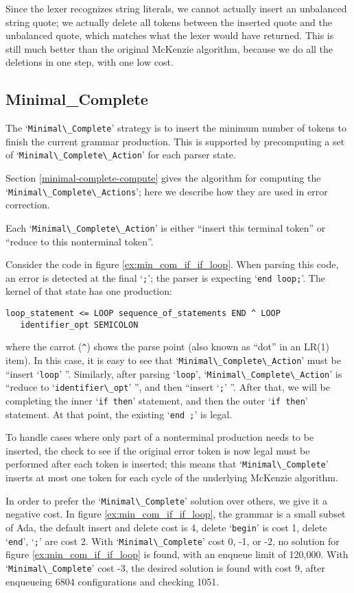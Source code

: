 \documentclass[authordraft]{acmart}
\newcommand{\code}[1]{`\lstinline|#1|'}
\begin{document}
Since the lexer recognizes string literals, we cannot actually insert
an unbalanced string quote; we actually delete all tokens between the
inserted quote and the unbalanced quote, which matches what the lexer
would have returned. This is still much better than the original
McKenzie algorithm, because we do all the deletions in one step, with
one low cost.

\subsection{Minimal\_Complete}
The \code{Minimal\_Complete} strategy is to insert the minimum number
of tokens to finish the current grammar production. This is supported
by precomputing a set of \code{Minimal\_Complete\_Action} for each
parser state.

Section \ref{minimal-complete-compute} gives the algorithm for
computing the \code{Minimal\_Complete\_Actions}; here we describe how
they are used in error correction.

Each \code{Minimal\_Complete\_Action} is either ``insert this terminal
token'' or ``reduce to this nonterminal token''.

Consider the code in figure \ref{ex:min_com_if_if_loop}. When
parsing this code, an error is detected at the final \code{;}; the
parser is expecting \code{end loop;}. The kernel of that state has one
production:
\begin{verbatim}
loop_statement <= LOOP sequence_of_statements END ^ LOOP
   identifier_opt SEMICOLON
\end{verbatim}
where the carrot (\verb|^|) shows the parse point (also known as
``dot'' in an LR(1) item). In this case, it is easy to see that
\code{Minimal\_Complete\_Action} must be ``insert \code{loop} ''.
Similarly, after parsing \code{loop}, \code{Minimal\_Complete\_Action}
is ``reduce to \code{identifier\_opt} '', and then ``insert \code{;}
''. After that, we will be completing the inner \code{if then}
statement, and then the outer \code{if then} statement. At that point,
the existing \code{end ;} is legal.

To handle cases where only part of a nonterminal production needs to
be inserted, the check to see if the original error token is now legal
must be performed after each token is inserted; this means that
\code{Minimal\_Complete} inserts at most one token for each cycle of
the underlying McKenzie algorithm.

In order to prefer the \code{Minimal\_Complete} solution over others,
we give it a negative cost. In figure \ref{ex:min_com_if_if_loop}, the
grammar is a small subset of Ada, the
default insert and delete cost is 4, delete \code{begin} is cost 1,
delete \code{end}, \code{;} are cost 2. With \code{Minimal\_Complete}
cost 0, -1, or -2, no solution for figure \ref{ex:min_com_if_if_loop}
is found, with an enqueue limit of 120,000. With
\code{Minimal\_Complete} cost -3, the desired solution is found with
cost 9, after enqueueing 6804 configurations and checking 1051.
\end{document}
